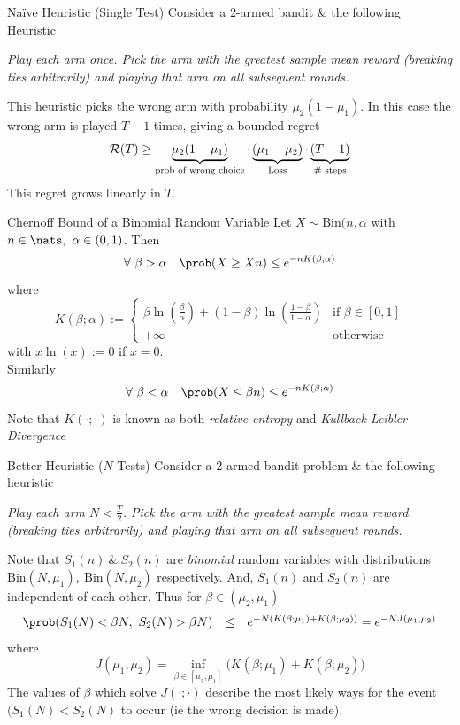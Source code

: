 \documentclass[11pt,a4paper]{article}
\begin{document}
  \begin{proposition}{Na\"ive Heuristic (Single Test)}
    Consider a 2-armed bandit \& the following Heuristic
    \begin{center}
      \textit{Play each arm once. Pick the arm with the greatest sample mean reward (breaking ties arbitrarily) and playing that arm on all subsequent rounds.}
    \end{center}
    This heuristic picks the wrong arm with probability $\mu_2(1-\mu_1)$. In this case the wrong arm is played $T-1$ times, giving a bounded regret
    \[ \mathcal{R}(T)\geq\underbrace{\mu_2(1-\mu_1)}_{\tiny\text{prob of wrong choice}}\cdot\underbrace{(\mu_1-\mu_2)}_{\tiny\text{Loss}}\cdot\underbrace{(T-1)}_{\tiny\text{\# steps}} \]
    This regret grows linearly in $T$.
  \end{proposition}

  \begin{theorem}{Chernoff Bound of a Binomial Random Variable}
    Let $X\sim\text{Bin}(n,\alpha$ with $n\in\nats,\ \alpha\in(0,1)$. Then
    \[ \forall\ \beta>\alpha\quad\prob(X\geq Xn)\leq e^{-nK(\beta;\alpha)} \]
    where
    \[ K(\beta;\alpha):=\begin{cases}\beta\ln\left(\frac\beta\alpha\right)+(1-\beta)\ln\left(\frac{1-\beta}{1-\alpha}\right)&\text{if }\beta\in[0,1]\\+\infty&\text{otherwise}\end{cases} \]
    with $x\ln(x):=0$ if $x=0$.\\
    Similarly
    \[ \forall\ \beta<\alpha\quad\prob(X\leq\beta n)\leq e^{-nK(\beta;\alpha)} \]
    Note that $K(\cdot;\cdot)$ is known as both \textit{relative entropy} and \textit{Kullback-Leibler Divergence}
  \end{theorem}

  \begin{proposition}{Better Heuristic ($N$ Tests)}
    Consider a 2-armed bandit problem \& the following heuristic
    \begin{center}
      \textit{Play each arm $N<\frac{T}2$. Pick the arm with the greatest sample mean reward (breaking ties arbitrarily) and playing that arm on all subsequent rounds.}
    \end{center}
    Note that $S_1(n)\ \&\ S_2(n)$ are \textit{binomial} random variables with distributions $\text{Bin}(N,\mu_1),\ \text{Bin}(N,\mu_2)$ respectively. And, $S_1(n)$ and $S_2(n)$ are independent of each other. Thus for $\beta\in(\mu_2,\mu_1)$
    \[\begin{array}{rcl}
      \prob(S_1(N)<\beta N,\ S_2(N)>\beta N)&\leq&e^{-N(K(\beta;\mu_1)+K(\beta;\mu_2))}=e^{-NJ(\mu_1,\mu_2)}
    \end{array}\]
    where
    \[ J(\mu_1,\mu_2)=\inf_{\beta\in[\mu_2,\mu_1]}\big(K(\beta;\mu_1)+K(\beta;\mu_2)\big) \]
    The values of $\beta$ which solve $J(\cdot;\cdot)$ describe the most likely ways for the event $(S_1(N)<S_2(N)$ to occur (ie the wrong decision is made).
  \end{proposition}
\end{document}
